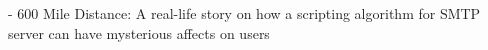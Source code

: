 - 600 Mile Distance: A real-life story on how a scripting algorithm for SMTP server can have mysterious affects on users\\
